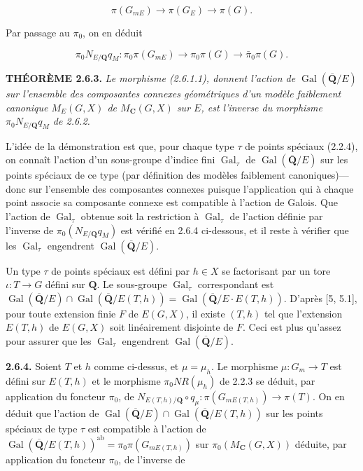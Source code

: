 \documentclass[10pt,a4paper]{article}
\begin{document}
\[
\pi(G_{mE})\longrightarrow\pi(G_E)\longrightarrow\pi(G).
\]

Par passage au \(\pi_0\), on en déduit

\[
\pi_0N_{E/\mathbf Q}q_M:\pi_0\pi(G_{mE})\longrightarrow\pi_0\pi(G)\longrightarrow\bar\pi_0\pi(G). \tag{2.6.2.1}
\]

\textbf{THÉORÈME 2.6.3.} \emph{Le morphisme (2.6.1.1), donnent l'action de \(\operatorname{Gal}(\overline{\mathbf Q}/E)\) sur l'ensemble des composantes connexes géométriques d'un modèle faiblement canonique \(M_E(G,X)\) de \(M_{\mathbf C}(G,X)\) sur \(E\), est l'inverse du morphisme \(\pi_0N_{E/\mathbf Q}q_M\) de 2.6.2.}

L'idée de la démonstration est que, pour chaque type \(\tau\) de points spéciaux (2.2.4), on connaît l'action d'un sous-groupe d'indice fini \(\operatorname{Gal}_\tau\) de \(\operatorname{Gal}(\overline{\mathbf Q}/E)\) sur les points spéciaux de ce type (par définition des modèles faiblement canoniques)---donc sur l'ensemble des composantes connexes puisque l'application qui à chaque point associe sa composante connexe est compatible à l'action de Galois. Que l'action de \(\operatorname{Gal}_\tau\) obtenue soit la restriction à \(\operatorname{Gal}_\tau\) de l'action définie par l'inverse de \(\pi_0(N_{E/\mathbf Q}q_M)\) est vérifié en 2.6.4 ci-dessous, et il reste à vérifier que les \(\operatorname{Gal}_\tau\) engendrent \(\operatorname{Gal}(\overline{\mathbf Q}/E)\).

Un type \(\tau\) de points spéciaux est défini par \(h\in X\) se factorisant par un tore \(\iota:T\to G\) défini sur \(\mathbf Q\). Le sous-groupe \(\operatorname{Gal}_\tau\) correspondant est \(\operatorname{Gal}(\overline{\mathbf Q}/E)\cap\operatorname{Gal}(\overline{\mathbf Q}/E(T,h))=\operatorname{Gal}(\overline{\mathbf Q}/E\cdot E(T,h))\). D'après {[}5, 5.1{]}, pour toute extension finie \(F\) de \(E(G,X)\), il existe \((T,h)\) tel que l'extension \(E(T,h)\) de \(E(G,X)\) soit linéairement disjointe de \(F\). Ceci est plus qu'assez pour assurer que les \(\operatorname{Gal}_\tau\) engendrent \(\operatorname{Gal}(\overline{\mathbf Q}/E)\).

\textbf{2.6.4.} Soient \(T\) et \(h\) comme ci-dessus, et \(\mu=\mu_h\). Le morphisme \(\mu:G_m\to T\) est défini sur \(E(T,h)\) et le morphisme \(\pi_0NR(\mu_h)\) de 2.2.3 se déduit, par application du foncteur \(\pi_0\), de \(N_{E(T,h)/\mathbf Q}\circ q_\mu:\pi(G_{mE(T,h)})\to\pi(T)\). On en déduit que l'action de \(\operatorname{Gal}(\overline{\mathbf Q}/E)\cap\operatorname{Gal}(\overline{\mathbf Q}/E(T,h))\) sur les points spéciaux de type \(\tau\) est compatible à l'action de \(\operatorname{Gal}(\overline{\mathbf Q}/E(T,h))^{\mathrm{ab}}=\pi_0\pi(G_{mE(T,h)})\) sur \(\pi_0(M_{\mathbf C}(G,X))\) déduite, par application du foncteur \(\pi_0\), de l'inverse de
\end{document}
